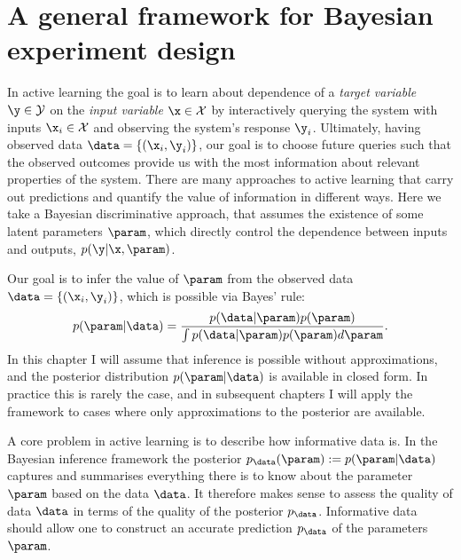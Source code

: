 \section{A general framework for Bayesian experiment design}

In active learning the goal is to learn about dependence of a \emph{target variable} $\y\in\mathcal{Y}$ on the \emph{input variable} $\x\in\mathcal{X}$ by interactively querying the system with inputs $\x_i\in\mathcal{X}$ and observing the system's response $\y_i$. Ultimately, having observed data $\data = \{(\x_i,\y_i)\}$, our goal is to choose future queries such that the observed outcomes provide us with the most information about relevant properties of the system. There are many approaches to active learning that carry out predictions and quantify the value of information in different ways. Here we take a Bayesian discriminative approach, that assumes the existence of some latent parameters $\param$, which directly control the dependence between inputs and outputs, $p(\y\vert\x,\param)$.

Our goal is to infer the value of $\param$ from the observed data $\data = \{(\x_i,\y_i)\}$, which is possible via Bayes' rule:
%
\begin{equation}
	p(\param\vert\data) = \frac{p(\data\vert\param)p(\param)}{\int p(\data\vert\param)p(\param) d\param}.
\end{equation}
%
In this chapter I will assume that inference is possible without approximations, and the posterior distribution $p(\param\vert\data)$ is available in closed form. In practice this is rarely the case, and in subsequent chapters I will apply the framework to cases where only approximations to the posterior are available.

A core problem in active learning is to describe how informative data is. In the Bayesian inference framework the posterior $p_\data(\param) := p(\param\vert\data)$ captures and summarises everything there is to know about the parameter $\param$ based on the data $\data$. It therefore makes sense to assess the quality of data $\data$ in terms of the quality of the posterior $p_\data$. Informative data should allow one to construct an accurate prediction $p_\data$ of the parameters $\param$.

